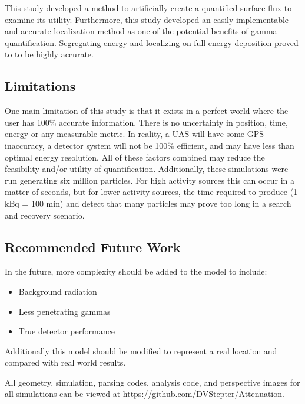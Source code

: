 \noindent This study developed a method to artificially create a quantified surface flux to examine its utility. Furthermore, this study developed an easily implementable and accurate localization method as one of the potential benefits of gamma quantification. Segregating energy and localizing on full energy deposition proved to to be highly accurate.

\subsection{Limitations}
\noindent One main limitation of this study is that it exists in a perfect world where the user has 100$\%$ accurate information. There is no uncertainty in position, time, energy or any measurable metric. In reality, a UAS will have some GPS inaccuracy, a detector system will not be 100$\%$ efficient, and may have less than optimal energy resolution. All of these factors combined may reduce the feasibility and/or utility of quantification. Additionally, these simulations were run generating six million particles. For high activity sources this can occur in a matter of seconds, but for lower activity sources, the time required to produce (1 kBq = 100 min) and detect that many particles may prove too long in a search and recovery scenario.

\subsection{Recommended Future Work}
\noindent In the future, more complexity should be added to the model to include:

\begin{itemize}
  \item Background radiation
  \item Less penetrating gammas
  \item True detector performance
\end{itemize}

Additionally this model should be modified to represent a real location and compared with real world results.

All geometry, simulation, parsing codes, analysis code, and perspective images for all simulations can be viewed at https://github.com/DVStepter/Attenuation.
